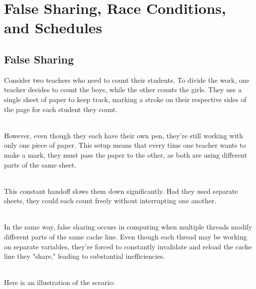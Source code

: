 \documentclass[../../main.tex]{subfiles}
\begin{document}
    \section{False Sharing, Race Conditions, and Schedules}
    \subsection{False Sharing}
    Consider two teachers who need to count their students. To divide the work, one teacher decides to count the boys, while the other counts the girls. They use a single sheet of paper to keep track, marking a stroke on their respective sides of the page for each student they count.
    
    ~\\
    However, even though they each have their own pen, they're still working with only one piece of paper. This setup means that every time one teacher wants to make a mark, they must pass the paper to the other, as both are using different parts of the same sheet.

    ~\\
    This constant handoff slows them down significantly. Had they used separate sheets, they could each count freely without interrupting one another.

    ~\\
    In the same way, false sharing occurs in computing when multiple threads modify different parts of the same cache line. Even though each thread may be working on separate variables, they're forced to constantly invalidate and reload the cache line they "share," leading to substantial inefficiencies.

    ~\\
    Here is an illustration of the sceario:
\end{document}
